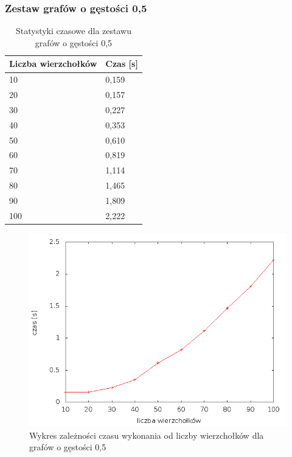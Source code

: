 \documentclass[12pt, a4paper]{article}
\begin{document}
\subsubsection*{Zestaw grafów o gęstości 0,5}
\begin{table}[H]
\caption{Statystyki czasowe dla zestawu grafów o gęstości 0,5}
\begin{center}
    \begin{tabular}{|l|l|}
    \hline
    Liczba wierzchołków &  Czas [s] \\ \hline
    10 & 0,159 \\ \hline
    20 & 0,157 \\ \hline
    30 & 0,227 \\ \hline
    40 & 0,353 \\ \hline
    50 & 0,610 \\ \hline
    60 & 0,819 \\ \hline
    70 & 1,114 \\ \hline
    80 & 1,465 \\ \hline
    90 & 1,809 \\ \hline
    100 & 2,222 \\ \hline
    \end{tabular}
\end{center}
\end{table}

\begin{figure}[h]
    \begin{center}
	\includegraphics[scale=0.5]{results/img/den/den_05.png}
	\caption{Wykres zależności czasu wykonania od liczby wierzchołków dla grafów o gęstości 0,5}
    \end{center}
\end{figure}
\end{document}

